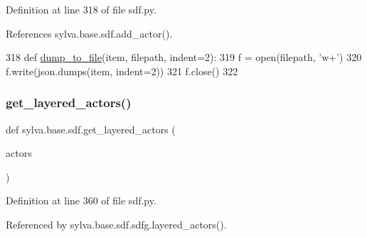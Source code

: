 Definition at line 318 of file sdf.\+py.



References sylva.\+base.\+sdf.\+add\+\_\+actor().


\begin{DoxyCode}
318     \textcolor{keyword}{def }\hyperlink{namespacesylva_1_1base_1_1sdf_a55c1c6ea91b0ed9948ce670cd269b88b}{dump\_to\_file}(item, filepath, indent=2):
319         f = open(filepath, \textcolor{stringliteral}{'w+'})
320         f.write(json.dumps(item, indent=2))
321         f.close()
322 
\end{DoxyCode}
\mbox{\label{namespacesylva_1_1base_1_1sdf_a1e0fb379d9b6a1f2adb650611bdb49e6}} 
\subsubsection{\texorpdfstring{get\+\_\+layered\+\_\+actors()}{get\_layered\_actors()}}
{\footnotesize\ttfamily def sylva.\+base.\+sdf.\+get\+\_\+layered\+\_\+actors (\begin{DoxyParamCaption}\item[{}]{actors }\end{DoxyParamCaption})}



Definition at line 360 of file sdf.\+py.



Referenced by sylva.\+base.\+sdf.\+sdfg.\+layered\+\_\+actors().


